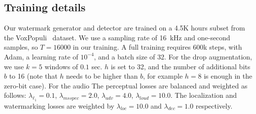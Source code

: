 \subsection{Training details}\label{chap4/sec:training-details}

Our watermark generator and detector are trained on a 4.5K hours subset from the VoxPopuli~\citep{voxpopuli-WangRLWTHWPD20} dataset.
We use a sampling rate of 16~kHz and one-second samples, so $T=16000$ in our training.
A full training requires 600k steps, with Adam, a learning rate of $10^{-4}$, and a batch size of 32.
For the drop augmentation, we use $k=5$ windows of $0.1$ sec. $h$ is set to 32, and the number of additional bits $b$ to 16 (note that $h$ needs to be higher than $b$, for example $h=8$ is enough in the zero-bit case). 
For the audio 
The perceptual losses are balanced and weighted as follows: $\lambda_{\ell_1} = 0.1$, $\lambda_{msspec} = 2.0$, $\lambda_{adv} = 4.0$, $\lambda_{loud} = 10.0$. 
The localization and watermarking losses are weighted by $\lambda_{loc} = 10.0$ and $\lambda_{dec} = 1.0$ respectively.


